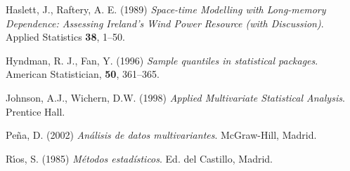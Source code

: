 \documentclass[spanish,12pt,a4paper]{article}
\begin{document}
\begin{thebibliography}{10}

Haslett, J., Raftery, A. E. (1989) \emph{Space-time Modelling with
   Long-memory Dependence: Assessing Ireland's Wind Power Resource
   (with Discussion)}. Applied Statistics \textbf{38}, 1--50.

Hyndman, R. J., Fan, Y. (1996) \emph{Sample quantiles in statistical
     packages}. American Statistician, \textbf{50}, 361--365.

Johnson, A.J., Wichern, D.W. (1998) \emph{Applied Multivariate Statistical
      Analysis}. Prentice Hall.

Pe\~{n}a, D. (2002) \emph{An\'alisis de datos multivariantes}. McGraw-Hill, Madrid.

R\'{\i}os, S. (1985) \emph{M\'etodos estad\'isticos}. Ed. del Castillo, Madrid.


\end{thebibliography}
\end{document}
